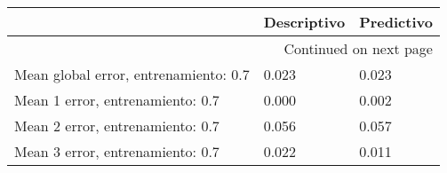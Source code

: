 \begin{longtable}{p{4cm}|p{2cm}|p{2cm}}
\toprule
{} &  Descriptivo &  Predictivo \\
\midrule
\endhead
\midrule
\multicolumn{3}{r}{{Continued on next page}} \\
\midrule
\endfoot

\bottomrule
\endlastfoot
Mean global error, entrenamiento: 0.7 &        0.023 &       0.023 \\
Mean 1 error, entrenamiento: 0.7      &        0.000 &       0.002 \\
Mean 2 error, entrenamiento: 0.7      &        0.056 &       0.057 \\
Mean 3 error, entrenamiento: 0.7      &        0.022 &       0.011 \\
\end{longtable}
